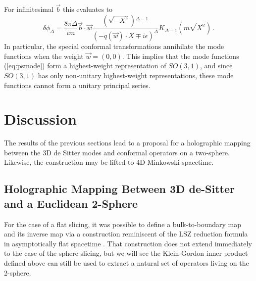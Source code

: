 \documentclass{brownthesis}
\begin{document}
For infinitesimal $\vec{b}$ this evaluates to
\begin{equation}
\delta\phi_{\Delta}=\frac{8\pi\Delta}{im}\vec{b}\cdot\vec{w}\frac{\left(\sqrt{-X^{2}}\right){}^{\Delta-1}}{(-q(\vec{w})\cdot X\mp i\epsilon)^{\Delta}}K_{\Delta-1}\left(m\sqrt{X^{2}}\right)\,.\label{eq:lxpsmode}
\end{equation}
In particular, the special conformal transformations annihilate the
mode functions when the weight $\vec{w}=(0,0)$. This implies \cite{doi:10.1142/9789813149441_0001}
that the mode functions (\ref{eq:psmode}) form a highest-weight representation
of $SO(3,1)$, and since $SO(3,1)$ has only non-unitary highest-weight
representations, these mode functions cannot form a unitary principal
series.

\section{Discussion}

\label{sec:further} The results of the previous sections lead to
a proposal for a holographic mapping between the 3D de Sitter modes
and conformal operators on a two-sphere. Likewise, the construction
may be lifted to 4D Minkowski spacetime.

\subsection{Holographic Mapping Between 3D de-Sitter and a Euclidean 2-Sphere}

For the case of a flat slicing, it was possible to define a bulk-to-boundary
map and its inverse map \cite{Chatterjee:2015pha} via a construction
reminiscent of the LSZ reduction formula in asymptotically flat spacetime
\cite{Lehmann:1954rq}. That construction does not extend immediately
to the case of the sphere slicing, but we will see the Klein-Gordon
inner product defined above can still be used to extract a natural
set of operators living on the 2-sphere.
\end{document}
